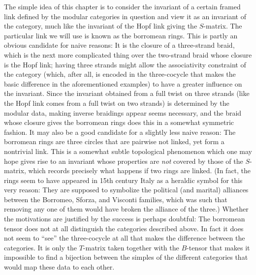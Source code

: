 \documentclass[a4paper, 10pt]{book}
\theoremstyle{definition}
\numberwithin{equation}{chapter}
\begin{document}
The simple idea of this chapter is to consider the invariant of a certain framed link defined by the modular categories in question and view it as an invariant of the category, much like the invariant of the Hopf link giving the $S$-matrix. The particular link we will use is known as the borromean rings. This is partly an obvious candidate for naive reasons: It is the closure of a three-strand braid, which is the next more complicated thing over the two-strand braid whose closure is the Hopf link; having three strands might allow the associativity constraint of the category (which, after all, is encoded in the three-cocycle that makes the basic difference in the aforementioned examples)  to have a greater influence on the invariant. Since the invariant obtained from a full twist on three strands (like the Hopf link comes from a full twist on two strands) is determined by the modular data, making inverse braidings appear seems necessary, and the braid whose closure gives the borromean rings does this in a somewhat symmetric fashion. It may also be a good candidate for a slightly less naive reason: The borromean rings are three circles that are pairwise not linked, yet form a nontrivial link. This is a somewhat subtle topological phenomenon which one may hope gives rise to an invariant whose properties are \emph{not} covered by those of the $S$-matrix, which records precisely what happens if two rings are linked. (In fact, the rings seem to have appeared in 15th century Italy as a heraldic symbol for this very reason: They are supposed to symbolize the political (and marital) alliances between the Borromeo, Sforza, and Visconti families, which was such that removing any one of them would have broken the alliance of the three.) Whether the motivations are justified by the success is perhaps doubtful: The borromean tensor does not at all distinguish the categories described above. In fact it does not seem to ``see'' the three-cocycle at all that makes the difference between the categories. It is only the $T$-matrix taken together with the $B$-tensor that makes it impossible to find a bijection between the simples of the different categories that would map these data to each other.
\end{document}

